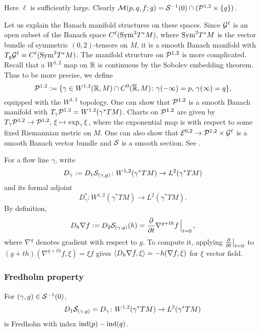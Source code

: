 Here $\ell$ is sufficiently large. 
Clearly ${\mathcal{M}}(p, q, f; g) = {\mathcal{S}}^{-1} (0) \cap ( {\mathcal{P}}^{1, 2} \times \{g\} )$.

\medskip

Let us explain the Banach manifold structures on these spaces. 
Since ${\mathcal{G}}^\ell$ is an open subset of the Banach space 
$C^\ell (\mathrm{Sym}^2 T^*M)$, where $\mathrm{Sym}^2 T^*M$ is the vector bundle 
of symmetric $(0, 2)$-tensors on $M$, it is a smooth Banach manifold 
with $T_g {\mathcal{G}}^\ell = C^\ell (\mathrm{Sym}^2 T^*M)$. 
The manifold structure on ${\mathcal{P}}^{1, 2}$ is more complicated. 
Recall that a $W^{1, 2}$ map on ${\mathbb{R}}$ is continuous 
by the Sobolev embedding theorem. 
Thus to be more precise, we define 
\[
	{\mathcal{P}}^{1, 2} := \{ \gamma \in W^{1, 2} ({\mathbb{R}}, M) \cap C^0 (\overline{{\mathbb{R}}}, M)
		\colon \gamma(-\infty) = p,\, \gamma(\infty) = q \},
\] 
equipped with the $W^{1, 2}$ topology. 
One can show that ${\mathcal{P}}^{1, 2}$ is a smooth Banach manifold 
with $T_\gamma {\mathcal{P}}^{1, 2} = W^{1, 2} (\gamma^*TM)$. 
Charts on ${\mathcal{P}}^{1, 2}$ are given by 
$T_\gamma {\mathcal{P}}^{1,2} \to {\mathcal{P}}^{1,2},\, \xi \mapsto \exp_\gamma \xi$, 
where the exponential map is with respect to 
some fixed Riemannian metric on $M$. 
One can also show that ${\mathcal{E}}^{0, 2} \to {\mathcal{P}}^{1, 2} \times {\mathcal{G}}^\ell$ 
is a smooth Banach vector bundle and ${\mathcal{S}}$ is a smooth section. 
See \cite[Appendix A]{Sch}.

\medskip

For a flow line $\gamma$, write 
\[
	D_\gamma := D_1{\mathcal{S}}_{(\gamma, g)} 
		\colon W^{1, 2} (\gamma^*TM) \to L^2 (\gamma^*TM)
\] 
and its formal adjoint 
\[
	D_\gamma^* \colon W^{1, 2} (\gamma^*TM) \to L^2 (\gamma^* TM).
\] 
By definition, 
\[
	D_h \nabla f := D_2{\mathcal{S}}_{(\gamma, g)} (h) 
		= \frac{\partial }{\partial t} \nabla^{g + th} f \,\Big|_{t=0}\,,
\] 
where $\nabla^g$ denotes gradient with respect to $g$. 
To compute it, applying $\frac{\partial }{\partial t} \big|_{t=0}$ to 
$(g + th) (\nabla^{g + th} f, \xi) = \xi f$ gives 
$\langle D_h \nabla f, \xi \rangle = - h (\nabla f, \xi)$ for $\xi$ vector field.

\subsubsection{Fredholm property}

\begin{proposition}
	For $(\gamma, g) \in {\mathcal{S}}^{-1} (0)$, 
	\[
		D_1{\mathcal{S}}_{(\gamma, g)} = 
			D_\gamma \colon W^{1, 2} (\gamma^*TM) \to L^2 (\gamma^*TM)
	\] 
	is Fredholm with index $\operatorname{ind}(p) - \operatorname{ind}(q)$.
\end{proposition}

